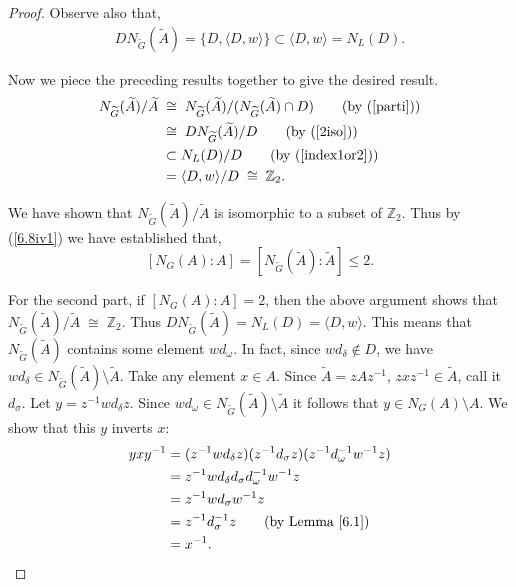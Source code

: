 \begin{proof}
  Observe also that, 
  \begin{align}\label{index1or2} DN_{\widetilde{G}}({\widetilde{A}}) = \{ D, \langle D, w \rangle \} \subset \langle D, w \rangle = N_L(D).
  \end{align}
  
  Now we piece the preceding results together to give the desired result.
  \begin{align*}  N_{\widetilde{G}}({\widetilde{A}}) / {\widetilde{A}} \; & \cong \;  N_{\widetilde{G}}({\widetilde{A}})/( N_{\widetilde{G}}({\widetilde{A}}) \cap D) \tag{by (\ref{parti})}
  \\ & \cong \; DN_{\widetilde{G}}({\widetilde{A}}) / D \tag{by (\ref{2iso})}
  \\ & \subset N_L(D) / D \tag{by (\ref{index1or2})}
  \\ &= \langle D, w \rangle / D \; \cong \; \mathbb{Z}_2.
  \end{align*}
  
  We have shown that $N_{\widetilde{G}}({\widetilde{A}}) / {\widetilde{A}}$ is isomorphic to a subset of $\mathbb{Z}_2$. Thus by (\ref{6.8iv1}) we have established that, $$[N_G(A): A] = [N_{\widetilde{G}}({\widetilde{A}}): {\widetilde{A}}] \leq 2.$$
  \vspace{-2mm}
  
  For the second part, if $[N_G(A): A] = 2$, then the above argument shows that $N_{\widetilde{G}}({\widetilde{A}}) / {\widetilde{A}} \; \cong \; \mathbb{Z}_2$. Thus $DN_{\widetilde{G}}({\widetilde{A}}) = N_L(D) = \langle D, w \rangle$. This means that $N_{\widetilde{G}}({\widetilde{A}})$ contains some element $wd_\omega$. In fact, since $w d_\delta \not \in D$, we have $w d_\delta \in N_{\widetilde{G}}({\widetilde{A}}) \! \setminus \! {\widetilde{A}}$. Take any element $x \in A$. Since ${\widetilde{A}} = zAz^{-1}$, $zxz^{-1} \in {\widetilde{A}}$, call it $d_\sigma$. Let $y = z^{-1}w d_\delta z$. Since $wd_\omega \in N_{\widetilde{G}}({\widetilde{A}}) \! \setminus \! {\widetilde{A}}$ it follows that $y \in N_G(A)\! \setminus \! A$. We show that this $y$ inverts $x$:
  \begin{align*} yxy^{-1} &= (z^{-1}w d_\delta z)(z^{-1} d_\sigma z)(z^{-1}d^{-1}_\omega w^{-1} z)
  \\ &= z^{-1} w d_\delta  d_\sigma d^{-1}_\omega w^{-1} z
  \\ &=  z^{-1} w  d_\sigma  w^{-1} z 
  \\ &=  z^{-1}  d^{-1}_\sigma z  \tag{by Lemma \ref{6.1}}
  \\ &= x^{-1}.
  \end{align*}
\end{proof}


